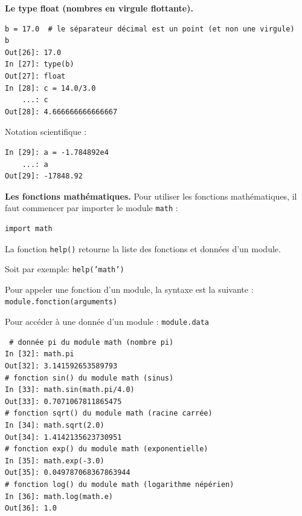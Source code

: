 \documentclass{beamer}
\begin{document}
\begin{frame}

\noindent\textbf{Le type float (nombres en virgule flottante).}
\begin{verbatim}
b = 17.0  # le séparateur décimal est un point (et non une virgule)
b
Out[26]: 17.0
In [27]: type(b)
Out[27]: float
In [28]: c = 14.0/3.0
    ...: c
Out[28]: 4.666666666666667
\end{verbatim}
Notation scientifique :
\begin{verbatim}
In [29]: a = -1.784892e4
    ...: a
Out[29]: -17848.92
\end{verbatim}
\end{frame}

\begin{frame}

\noindent\textbf{Les fonctions mathématiques.}
Pour utiliser les fonctions mathématiques, il faut commencer par importer le module \texttt{math} :

\begin{verbatim}
import math
\end{verbatim}
La fonction \texttt{help()} retourne la liste des fonctions et données d'un module.

Soit par exemple: \texttt{help('math')}
\end{frame}

\begin{frame}

Pour appeler une fonction d'un module, la syntaxe est la suivante : \texttt{module.fonction(arguments)}

Pour accéder à une donnée d'un module : \texttt{module.data}

\begin{verbatim}
 # donnée pi du module math (nombre pi)
In [32]: math.pi
Out[32]: 3.141592653589793
# fonction sin() du module math (sinus)
In [33]: math.sin(math.pi/4.0)
Out[33]: 0.7071067811865475
# fonction sqrt() du module math (racine carrée)
In [34]: math.sqrt(2.0)
Out[34]: 1.4142135623730951
# fonction exp() du module math (exponentielle)
In [35]: math.exp(-3.0)
Out[35]: 0.049787068367863944
# fonction log() du module math (logarithme népérien)
In [36]: math.log(math.e)
Out[36]: 1.0
\end{verbatim}
\end{frame}
\end{document}
